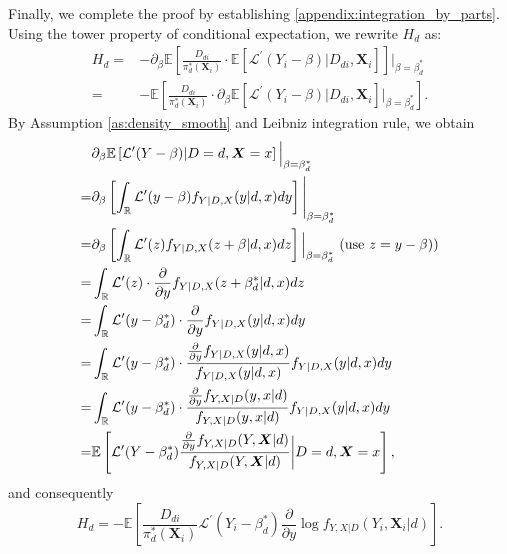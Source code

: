 \documentclass[11pt]{article}
\numberwithin{equation}{section}
\begin{document}
Finally, we complete the proof by establishing \eqref{appendix:integration_by_parts}. Using the tower property of
conditional expectation, we rewrite $H_{d}$ as:
\begin{align*}
	H_{d}=& -\partial _{\beta}\mathbb{E}\left[ \frac{D_{di}}{\pi_d^*(\boldsymbol{X}_{i})}\cdot \mathbb{E%
	}\left[ \mathcal{L}^{\prime }(Y_i-\beta)|D_{di},\boldsymbol{X}_{i}\right] \right] \Bigg|_{\beta=\beta_d^*} \\
	=& -\mathbb{E}\left[\frac{D_{di}}{\pi_d^*(\boldsymbol{X}_{i})}\cdot \partial _{\beta }\mathbb{E}\left[ \mathcal{L}^{\prime }(Y_i-\beta)|D_{di},\boldsymbol{X}_{i}\right] \Big|
	_{{\beta }={\beta }_d^{\ast }}\right]  .
\end{align*}
By Assumption \ref{as:density_smooth} and Leibniz integration rule, we obtain
\begin{align*}
	&\partial _{\beta}\mathbb{E}\left[ \mathcal{L}^{\prime }(Y-\beta)|D=d,\boldsymbol{X}=x\right] \Big|_{{\beta }=\beta_d^*} \notag \\
	=&\partial _{\beta }\left[\int_{\mathbb{R}}\mathcal{L}'(y-\beta)f_{Y|D,X}(y|d,x)dy\right]\Bigg|_{{\beta}={\beta }_{d}^*} \\
	=&\partial _{\beta }\left[\int_{\mathbb{R}}\mathcal{L}'(z)f_{Y|D,X}(z+\beta|d,x)dz\right]\Big|_{{\beta }=\beta_{d}^*}\  (\text{use}\ z=y-\beta)) \\
	=& \int_{\mathbb{R}}\mathcal{L}'(z)\cdot \frac{\partial}{\partial y}f_{Y|D,X}(z+\beta_d^*|d,x)dz\\
	=& \int_{\mathbb{R}}\mathcal{L}'(y-\beta_d^*)\cdot \frac{\partial}{\partial y}f_{Y|D,X}(y|d,x)dy \\
	=& \int_{\mathbb{R}}\mathcal{L}'(y-\beta_d^*)\cdot \frac{\frac{\partial}{\partial y}f_{Y|D,X}(y|d,x)}{f_{Y|D,X}(y|d,x)}f_{Y|D,X}(y|d,x)dy\\
	=& \int_{\mathbb{R}}\mathcal{L}'(y-\beta_d^*)\cdot \frac{\frac{\partial}{\partial y}f_{Y,X|D}(y,x|d)}{f_{Y,X|D}(y,x|d)}f_{Y|D,X}(y|d,x)dy \\
	=& \mathbb{E}\left[ \mathcal{L}^{\prime }(Y-\beta_d^*)\frac{\frac{
			\partial }{\partial y}f_{Y,X|D}(Y,\boldsymbol{X}|d)}{f_{Y,X|D}(Y,\boldsymbol{X}|d)}\bigg|D=d,\boldsymbol{X}=x
	\right],
\end{align*}
and consequently
\begin{equation*}
	H_{d}=-\mathbb{E}\left[\frac{D_{di}}{\pi_d^*(\boldsymbol{X}_{i})}\mathcal{L}^{\prime }(Y_i-\beta_d^*) \frac{\partial }{\partial y}\log f_{Y,X|D}(Y_i,\boldsymbol{X}_{i}|d) \right] .
\end{equation*}
\end{document}
